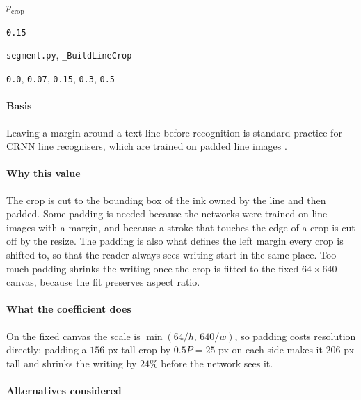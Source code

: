 \label{coef:crop-pad}

\begin{description}[leftmargin=5.2em,style=sameline]

\item[Symbol] $p_{\text{crop}}$

\item[Value] \texttt{0.15}

\item[Source] \texttt{segment.py}, \texttt{\_BuildLineCrop}

\item[Swept] \texttt{0.0}, \texttt{0.07}, \texttt{0.15}, \texttt{0.3}, \texttt{0.5}

\end{description}

\paragraph{Basis}

Leaving a margin around a text line before recognition is standard practice for CRNN line recognisers, which are trained on padded line images \cite{shi2017,puigcerver2017}.

\paragraph{Why this value}

The crop is cut to the bounding box of the ink owned by the line and then padded. Some padding is needed because the networks were trained on line images with a margin, and because a stroke that touches the edge of a crop is cut off by the resize. The padding is also what defines the left margin every crop is shifted to, so that the reader always sees writing start in the same place. Too much padding shrinks the writing once the crop is fitted to the fixed $64\times640$ canvas, because the fit preserves aspect ratio.

\paragraph{What the coefficient does}

On the fixed canvas the scale is $\min(64/h,\,640/w)$, so padding costs resolution directly: padding a $156$ px tall crop by $0.5P = 25$ px on each side makes it $206$ px tall and shrinks the writing by $24\%$ before the network sees it.

\paragraph{Alternatives considered}

